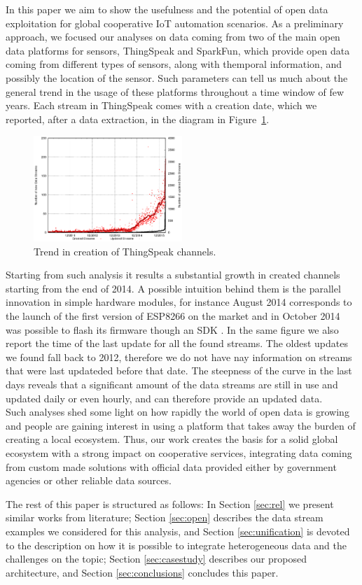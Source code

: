 In this paper we aim to show the usefulness and the potential of open data exploitation for global cooperative IoT automation scenarios.
As a preliminary approach, we focused our analyses on data coming from two of the main open data platforms for sensors, ThingSpeak and SparkFun, which provide open data coming from different types of sensors, along with themporal information, and possibly the location of the sensor.
Such parameters can tell us much about the general trend in the usage of these platforms throughout a time window of few years.
Each stream in ThingSpeak comes with a creation date, which we reported, after a data extraction, in the diagram in Figure~\ref{creationtrend}.
\begin{figure}[btp]
\centering
\includegraphics[width=0.50\textwidth]{img/bars.eps} 
\caption{Trend in creation of ThingSpeak channels.}
\label{creationtrend}
\end{figure}
Starting from such analysis it results a substantial growth in created channels starting from the end of 2014. 
A possible intuition behind them is the parallel innovation in simple hardware modules, for instance August 2014 corresponds to the launch of the first version of ESP8266 \cite{esp8266} on the market and in October 2014 was possible to flash its firmware though an SDK \cite{espressif}.
In the same figure we also report the time of the last update for all the found streams.
The oldest updates we found fall back to 2012, therefore we do not have nay information on streams that were last updateded before that date.
The steepness of the curve in the last days reveals that a significant amount of the data streams are still in use and updated daily or even hourly, and can therefore provide an updated data.
\\
Such analyses shed some light on how rapidly the world of open data is growing and people are gaining interest in using a platform that takes away the burden of creating a local ecosystem.
Thus, our work creates the basis for a solid global ecosystem with a strong impact on cooperative services, integrating data coming from custom made solutions with official data provided either by government agencies or other reliable data sources. 

The rest of this paper is structured as follows: In Section \ref{sec:rel} we present similar works from literature; Section \ref{sec:open} describes the data stream examples we considered for this analysis, and Section \ref{sec:unification} is devoted to the description on how it is possible to integrate heterogeneous data and the challenges on the topic; Section \ref{sec:casestudy} describes our proposed architecture, and Section \ref{sec:conclusions} concludes this paper.
